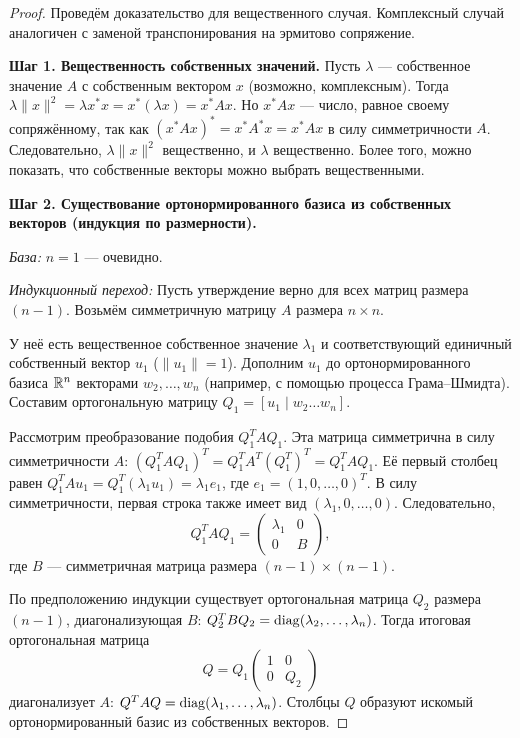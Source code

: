 \documentclass[10pt]{article}
\begin{document}
\begin{proof}
    Проведём доказательство для вещественного случая. Комплексный случай аналогичен с заменой транспонирования на эрмитово сопряжение.

    \textbf{Шаг 1. Вещественность собственных значений.}
    Пусть $\lambda$ — собственное значение $A$ с собственным вектором $x$ (возможно, комплексным). Тогда $\lambda \|x\|^2 = \lambda x^* x = x^* (\lambda x) = x^* A x$. Но $x^* A x$ — число, равное своему сопряжённому, так как $(x^* A x)^* = x^* A^* x = x^* A x$ в силу симметричности $A$. Следовательно, $\lambda \|x\|^2$ вещественно, и $\lambda$ вещественно. Более того, можно показать, что собственные векторы можно выбрать вещественными.

    \textbf{Шаг 2. Существование ортонормированного базиса из собственных векторов (индукция по размерности).}
    
    \textit{База:} $n=1$ — очевидно.
    
    \textit{Индукционный переход:} Пусть утверждение верно для всех матриц размера $(n-1)$. Возьмём симметричную матрицу $A$ размера $n\times n$.
    
    У неё есть вещественное собственное значение $\lambda_1$ и соответствующий единичный собственный вектор $u_1$ ($\|u_1\|=1$). Дополним $u_1$ до ортонормированного базиса $\mathbb{R}^n$ векторами $w_2,\dots,w_n$ (например, с помощью процесса Грама–Шмидта). Составим ортогональную матрицу $Q_1 = [u_1 \mid w_2 \dots w_n]$.
    
    Рассмотрим преобразование подобия $Q_1^T A Q_1$. Эта матрица симметрична в силу симметричности $A$: $(Q_1^T A Q_1)^T = Q_1^T A^T (Q_1^T)^T = Q_1^T A Q_1$. Её первый столбец равен $Q_1^T A u_1 = Q_1^T (\lambda_1 u_1) = \lambda_1 e_1$, где $e_1 = (1,0,\dots,0)^T$. В силу симметричности, первая строка также имеет вид $(\lambda_1, 0,\dots,0)$. Следовательно,
    \[
    Q_1^T A Q_1 = \begin{pmatrix}
    \lambda_1 & 0 \\
    0 & B
    \end{pmatrix},
    \]
    где $B$ — симметричная матрица размера $(n-1)\times (n-1)$.
    
    По предположению индукции существует ортогональная матрица $Q_2$ размера $(n-1)$, диагонализующая $B$: $Q_2^T B Q_2 = \operatorname{diag}(\lambda_2,\dots,\lambda_n)$. Тогда итоговая ортогональная матрица
    \[
    Q = Q_1 \begin{pmatrix} 1 & 0 \\ 0 & Q_2 \end{pmatrix}
    \]
    диагонализует $A$: $Q^T A Q = \operatorname{diag}(\lambda_1,\dots,\lambda_n)$. Столбцы $Q$ образуют искомый ортонормированный базис из собственных векторов.
\end{proof}
\end{document}
